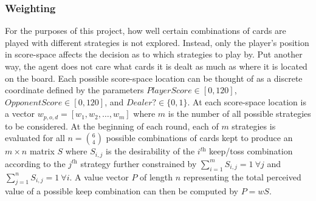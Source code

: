 

\subsubsection{Weighting}



For the purposes of this project,
how well certain combinations of cards are played with different strategies
is not explored.
%
Instead, only the player's position in score-space affects the decision as to
which strategies to play by.
%
Put another way, the agent does not care what cards it is dealt as much as where
it is located on the board.
%
Each possible score-space location can be thought of as a discrete coordinate
defined by the parameters
$\textit{PlayerScore} \in [0, 120]$,
$\textit{OpponentScore} \in [0, 120]$,
and
$\textit{Dealer?} \in \{0,1\}$.
%
At each score-space location is a vector $w_{p,o,d} = [w_1,w_2,\ldots,w_m]$
where $m$ is the number of all possible strategies to be considered.
At the beginning of each round, each of $m$ strategies is evaluated for all
$n = {6 \choose 4}$ possible combinations of cards kept to produce an
$m \times n$ matrix $S$
where $S_{i,j}$ is the desirability of the $i^{\textit{th}}$ keep/toss
combination according to the $j^{\textit{th}}$ strategy
further constrained by
$\sum_{i=1}^{m} S_{i,j} = 1\ \forall j$
and $\sum_{j=1}^{n} S_{i,j} = 1\ \forall i$.
%
A value vector $P$ of length $n$ representing the total perceived value of a
possible keep combination
can then be computed by
$P = w S$.
%


